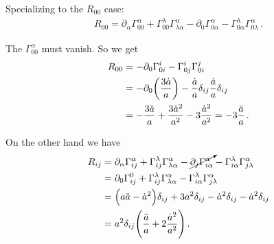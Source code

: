 \documentclass[main.tex]{subfiles}
\begin{document}
Specializing to the \(R_{00} \) case: 
\begin{align}
    R_{0 0 } = \partial_{\alpha} \Gamma^{\alpha }_{ 0 0 } + \Gamma^{\lambda }_{0 0 } \Gamma^{\alpha }_{\lambda \alpha } - \partial_{0 }\Gamma^{\alpha }_{0 \alpha } - \Gamma^{\lambda }_{0 \alpha } \Gamma^{\alpha }_{0 \lambda }
  \,.
\end{align}

The \(\Gamma^{\alpha }_{00}\) must vanish. So we get 
%
\begin{subequations}
\begin{align}
  R_{00} &= - \partial_{0} \Gamma^{i}_{0i} - \Gamma^{i}_{0j} \Gamma^{j}_{0i}  \\
  &= - \partial_{0} \qty(\frac{3 \dot{a}}{a}) - \frac{\dot{a}}{a} \delta_{ij} \frac{\dot{a}}{a} \delta_{ij}  \\
  &= - \frac{3 \ddot{a}}{a} + \frac{3 \dot{a}^2}{a^2} 
  - 3 \frac{\dot{a}^2}{a^2} = - 3 \frac{\ddot{a}}{a}
\,.
\end{align}
\end{subequations}

On the other hand we have 
%
\begin{subequations}
\begin{align}
R_{i j } &= \partial_{\alpha} \Gamma^{\alpha }_{ i j } + \Gamma^{\lambda }_{i j } \Gamma^{\alpha }_{\lambda \alpha } - \cancelto{}{\partial_{j }\Gamma^{\alpha }_{i \alpha }} - \Gamma^{\lambda }_{i \alpha } \Gamma^{\alpha }_{j \lambda }  \\
&= \partial_{0} \Gamma^{0 }_{ i j } 
+ \Gamma^{\lambda }_{i j } \Gamma^{\alpha }_{\lambda \alpha }
- \Gamma^{\lambda }_{i \alpha } \Gamma^{\alpha }_{j \lambda }
\\
&= \qty(a \ddot{a} - \dot{a}^2)  \delta_{ij}
+ 3 a^2 \delta_{ij} - \dot{a}^2 \delta_{ij} - \dot{a}^2 \delta_{ij}  \\
&= a^2 \delta_{ij} \qty(\frac{\ddot{a}}{a} + 2 \frac{\dot{a}^2}{a^2})
\,.
\end{align}
\end{subequations}
\end{document}
